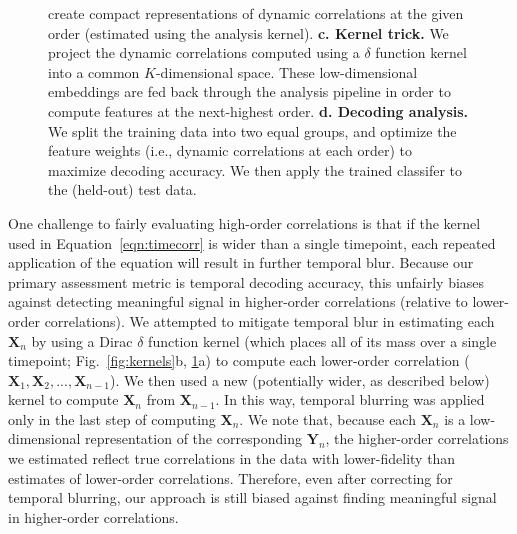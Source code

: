 \documentclass[english]{article}
\begin{document}
\begin{figure}[tp]
{    create compact representations of dynamic correlations at the
    given order (estimated using the analysis kernel).
    \textbf{c. Kernel trick.} We project the dynamic correlations
    computed using a $\delta$ function kernel into a common
    $K$-dimensional space.  These low-dimensional embeddings are fed
    back through the analysis pipeline in order to compute features at
    the next-highest order.  \textbf{d. Decoding analysis.} We split
    the training data into two equal groups, and optimize the feature
    weights (i.e., dynamic correlations at each order) to maximize
    decoding accuracy.  We then apply the trained classifer to the
    (held-out) test data.
  \label{fig:pipeline}}
\end{figure}


One challenge to fairly evaluating high-order correlations is that if
the kernel used in Equation~\ref{eqn:timecorr} is wider than a single
timepoint, each repeated application of the equation will result in
further temporal blur.  Because our primary assessment metric is
temporal decoding accuracy, this unfairly biases against detecting
meaningful signal in higher-order correlations (relative to
lower-order correlations).  We attempted to mitigate temporal blur in
estimating each $\mathbf{X}_n$ by using a Dirac $\delta$ function
kernel (which places all of its mass over a single timepoint;
Fig.~\ref{fig:kernels}b, \ref{fig:pipeline}a) to compute each lower-order correlation
($\mathbf{X}_1, \mathbf{X}_2, ..., \mathbf{X}_{n-1}$).  We then used a
new (potentially wider, as described below) kernel to compute
$\mathbf{X}_{n}$ from $\mathbf{X}_{n-1}$.  In this way, temporal
blurring was applied only in the last step of computing
$\mathbf{X}_n$.  We note that, because each $\mathbf{X}_n$ is a
low-dimensional representation of the corresponding $\mathbf{Y}_n$,
the higher-order correlations we estimated reflect true correlations
in the data with lower-fidelity than estimates of lower-order
correlations.  Therefore, even after correcting for temporal blurring,
our approach is still biased against finding meaningful signal in
higher-order correlations.
\end{document}
